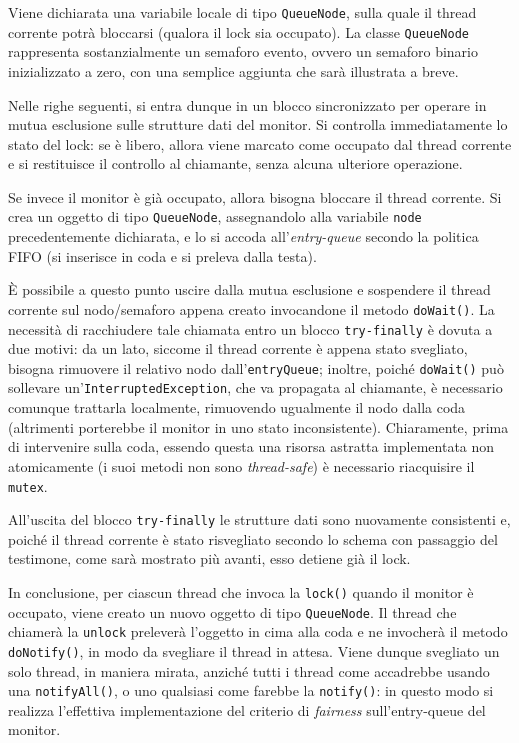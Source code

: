 \documentclass[a4paper,twoside]{article}
\newcommand\code{\lstinline[basicstyle=\normalsize\ttfamily]}
\begin{document}
Viene dichiarata una variabile locale di tipo \code|QueueNode|, sulla quale il thread corrente potrà bloccarsi (qualora il lock sia occupato). La classe \code|QueueNode| rappresenta sostanzialmente un semaforo evento, ovvero un semaforo binario inizializzato a zero, con una semplice aggiunta che sarà illustrata a breve.

Nelle righe seguenti, si entra dunque in un blocco sincronizzato per operare in mutua esclusione sulle strutture dati del monitor. Si controlla immediatamente lo stato del lock: se è libero, allora viene marcato come occupato dal thread corrente e si restituisce il controllo al chiamante, senza alcuna ulteriore operazione.

Se invece il monitor è già occupato, allora bisogna bloccare il thread corrente. Si crea un oggetto di tipo \code|QueueNode|, assegnandolo alla variabile \code|node| precedentemente dichiarata, e lo si accoda all'\emph{entry-queue} secondo la politica FIFO (si inserisce in coda e si preleva dalla testa).

È possibile a questo punto uscire dalla mutua esclusione e sospendere il thread corrente sul nodo/semaforo appena creato invocandone il metodo \code|doWait()|. La necessità di racchiudere tale chiamata entro un blocco \code|try-finally| è dovuta a due motivi: da un lato, siccome il thread corrente è appena stato svegliato, bisogna rimuovere il relativo nodo dall'\code|entryQueue|; inoltre, poiché \code|doWait()| può sollevare un'\code|InterruptedException|, che va propagata al chiamante, è necessario comunque trattarla localmente, rimuovendo ugualmente il nodo dalla coda (altrimenti porterebbe il monitor in uno stato inconsistente). Chiaramente, prima di intervenire sulla coda, essendo questa una risorsa astratta implementata non atomicamente (i suoi metodi non sono \emph{thread-safe}) è necessario riacquisire il \code|mutex|.

All'uscita del blocco \code|try-finally| le strutture dati sono nuovamente consistenti e, poiché il thread corrente è stato risvegliato secondo lo schema con passaggio del testimone, come sarà mostrato più avanti, esso detiene già il lock.

In conclusione, per ciascun thread che invoca la \code|lock()| quando il monitor è occupato, viene creato un nuovo oggetto di tipo \code|QueueNode|. Il thread che chiamerà la \code|unlock| preleverà l'oggetto in cima alla coda e ne invocherà il metodo \code|doNotify()|, in modo da svegliare il thread in attesa. Viene dunque svegliato un solo thread, in maniera mirata, anziché tutti i thread come accadrebbe usando una \code|notifyAll()|, o uno qualsiasi come farebbe la \code|notify()|: in questo modo si realizza l'effettiva implementazione del criterio di \emph{fairness} sull'entry-queue del monitor.
\end{document}

